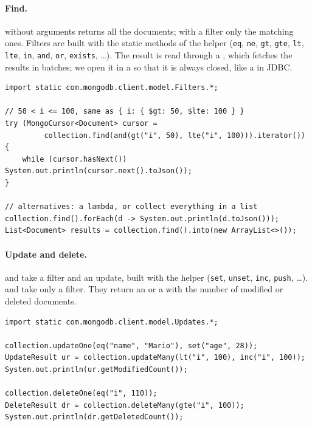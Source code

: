 \paragraph{Find.}  without arguments returns all the documents; with a filter only the matching ones. Filters are built with the static methods of the  helper (\texttt{eq}, \texttt{ne}, \texttt{gt}, \texttt{gte}, \texttt{lt}, \texttt{lte}, \texttt{in}, \texttt{and}, \texttt{or}, \texttt{exists}, \dots). The result is read through a , which fetches the results in batches; we open it in a  so that it is always closed, like a  in JDBC.
\begin{lstlisting}
import static com.mongodb.client.model.Filters.*;

// 50 < i <= 100, same as { i: { $gt: 50, $lte: 100 } }
try (MongoCursor<Document> cursor =
         collection.find(and(gt("i", 50), lte("i", 100))).iterator()) {
    while (cursor.hasNext()) System.out.println(cursor.next().toJson());
}

// alternatives: a lambda, or collect everything in a list
collection.find().forEach(d -> System.out.println(d.toJson()));
List<Document> results = collection.find().into(new ArrayList<>());
\end{lstlisting}

\paragraph{Update and delete.}  and  take a filter and an update, built with the  helper (\texttt{set}, \texttt{unset}, \texttt{inc}, \texttt{push}, \dots).  and  take only a filter. They return an  or a  with the number of modified or deleted documents.
\begin{lstlisting}
import static com.mongodb.client.model.Updates.*;

collection.updateOne(eq("name", "Mario"), set("age", 28));
UpdateResult ur = collection.updateMany(lt("i", 100), inc("i", 100));
System.out.println(ur.getModifiedCount());

collection.deleteOne(eq("i", 110));
DeleteResult dr = collection.deleteMany(gte("i", 100));
System.out.println(dr.getDeletedCount());
\end{lstlisting}

